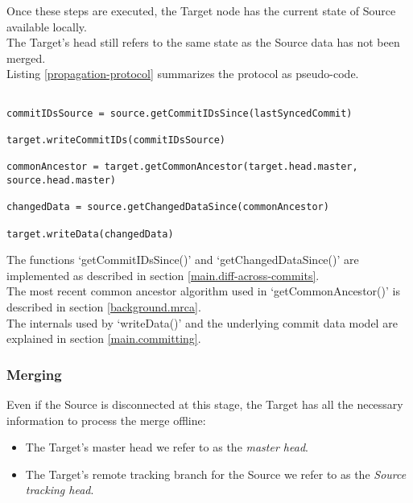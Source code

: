 Once these steps are executed, the Target node has the current state of Source available locally.\\
The Target's head still refers to the same state as the Source data has not been merged.\\

Listing \ref{propagation-protocol} summarizes the protocol as pseudo-code.

\begin{lstlisting}[caption=Propagation Protocol, label=propagation-protocol]

commitIDsSource = source.getCommitIDsSince(lastSyncedCommit)

target.writeCommitIDs(commitIDsSource)

commonAncestor = target.getCommonAncestor(target.head.master, source.head.master)

changedData = source.getChangedDataSince(commonAncestor)

target.writeData(changedData)

\end{lstlisting}

The functions `getCommitIDsSince()' and `getChangedDataSince()' are implemented as described in section \ref{main.diff-across-commits}.\\
The most recent common ancestor algorithm used in `getCommonAncestor()' is described in section \ref{background.mrca}.\\
The internals used by `writeData()' and the underlying commit data model are explained in section \ref{main.committing}.

\subsubsection{Merging}
Even if the Source is disconnected at this stage, the Target has all the necessary information to process the merge offline:\\

\begin{itemize}
\item The Target's master head we refer to as the \emph{master head}.\\
\item The Target's remote tracking branch for the Source we refer to as the \emph{Source tracking head}.
\end{itemize}

